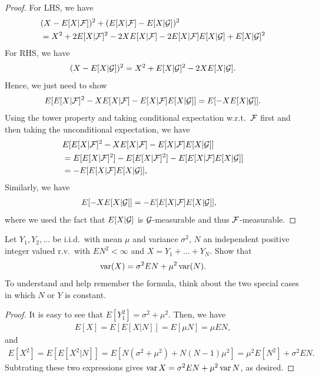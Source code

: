 \documentclass[a4paper]{article}
\begin{document}
\begin{proof}
  For LHS, we have
  \begin{align*}
     & (X - E[X | \mathcal{F}])^2 + (E[X | \mathcal{F}] - E [X | \mathcal{G}])^2      \\
     & = X^2 + 2 E[X | \mathcal{F}]^2 - 2 X E[X | \mathcal{F}] - 2 E[X | \mathcal{F}]
    E [X | \mathcal{G}] + E[X | \mathcal{G}]^2
  \end{align*}
  For RHS, we have
  \begin{align*}
    (X - E[X | \mathcal{G}])^2 = X^2 + E[X | \mathcal{G}]^2 - 2 X E[X | \mathcal{G}].
  \end{align*}
  Hence, we just need to show
  \[
    E[E[X | \mathcal{F}]^2 - X E[X | \mathcal{F}] - E[X | \mathcal{F}]
        E [X | \mathcal{G}]]
    = E[- X E[X | \mathcal{G}]].
  \]
  Using the tower property and taking conditional expectation
  w.r.t.\ $\mathcal{F}$ first and then taking the unconditional
  expectation, we have
  \begin{align*}
     & E[E[X | \mathcal{F}]^2 - X E[X | \mathcal{F}] - E[X | \mathcal{F}]
           E [X | \mathcal{G}]] \\
     & = E[E[X | \mathcal{F}]^2] - E[E[X | \mathcal{F}]^2]
    - E[E[X | \mathcal{F}] E[X | \mathcal{G}]]                     \\
     & = - E[E[X | \mathcal{F}] E[X | \mathcal{G}]],
  \end{align*}
  Similarly, we have
  \begin{align*}
    E[- X E[X | \mathcal{G}]]
     & = - E[E[X | \mathcal{F}] E[X | \mathcal{G}]],
  \end{align*}
  where we used the fact that $E[X | \mathcal{G}]$ is $\mathcal{G}$-measurable
  and thus $\mathcal{F}$-measurable.

\end{proof}

\begin{ex}[Durrett 4.1.8]
  Let $Y_1, Y_2, \dots$ be i.i.d.\ with mean $\mu$ and variance
  $\sigma^2$, $N$ an independent positive integer valued r.v.\
  with $E N^2 < \infty$ and $X = Y_1 + \dots + Y_N$. Show that
  \[
    \operatorname{var} (X) = \sigma^2 E N + \mu^2 \operatorname{var} (N).
  \]
  To understand and
  help remember the formula, think about the two special cases
  in which $N$ or $Y$ is constant.
\end{ex}

\begin{proof}
  It is easy to see that $E[Y_1^2]= \sigma^2 + \mu^2$. Then,
  we have
  \begin{align*}
    E[X] = E[E[X | N]] = E[\mu N] = \mu EN,
  \end{align*}
  and
  \begin{align*}
    E[X^2] = E[E[X^2 | N]]
    = E[N (\sigma^2 + \mu^2) + N (N - 1) \mu^2]
    = \mu^2 E[N^2] + \sigma^2 E N.
  \end{align*}
  Subtrating these two expressions gives $\operatorname{var} X = \sigma^2 EN + \mu^2
    \operatorname{var} N$, as desired.
\end{proof}
\end{document}
